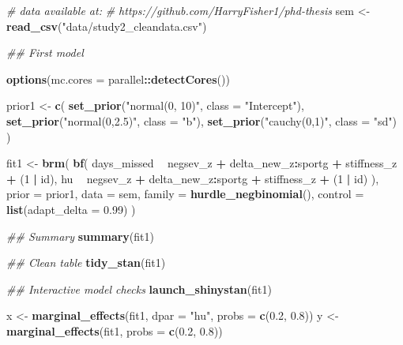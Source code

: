 \documentclass[man,floatsintext]{apa6}
\newenvironment{Shaded}{\begin{snugshade}}{\end{snugshade}}
\newcommand{\CommentTok}[1]{\textcolor[rgb]{0.56,0.35,0.01}{\textit{#1}}}
\newcommand{\DataTypeTok}[1]{\textcolor[rgb]{0.13,0.29,0.53}{#1}}
\newcommand{\DecValTok}[1]{\textcolor[rgb]{0.00,0.00,0.81}{#1}}
\newcommand{\FloatTok}[1]{\textcolor[rgb]{0.00,0.00,0.81}{#1}}
\newcommand{\KeywordTok}[1]{\textcolor[rgb]{0.13,0.29,0.53}{\textbf{#1}}}
\newcommand{\NormalTok}[1]{#1}
\newcommand{\OperatorTok}[1]{\textcolor[rgb]{0.81,0.36,0.00}{\textbf{#1}}}
\newcommand{\StringTok}[1]{\textcolor[rgb]{0.31,0.60,0.02}{#1}}
\begin{document}
\begin{Shaded}
\begin{Highlighting}[]
\CommentTok{# data available at: }
\CommentTok{# https://github.com/HarryFisher1/phd-thesis}
\NormalTok{sem <-}\StringTok{ }\KeywordTok{read_csv}\NormalTok{(}\StringTok{"data/study2_cleandata.csv"}\NormalTok{) }

\CommentTok{## First model}

\KeywordTok{options}\NormalTok{(}\DataTypeTok{mc.cores =}\NormalTok{ parallel}\OperatorTok{::}\KeywordTok{detectCores}\NormalTok{())}

\NormalTok{prior1 <-}\StringTok{ }\KeywordTok{c}\NormalTok{(}
  \KeywordTok{set_prior}\NormalTok{(}\StringTok{"normal(0, 10)"}\NormalTok{, }\DataTypeTok{class =} \StringTok{"Intercept"}\NormalTok{),}
  \KeywordTok{set_prior}\NormalTok{(}\StringTok{"normal(0,2.5)"}\NormalTok{, }\DataTypeTok{class =} \StringTok{"b"}\NormalTok{),}
  \KeywordTok{set_prior}\NormalTok{(}\StringTok{"cauchy(0,1)"}\NormalTok{, }\DataTypeTok{class =} \StringTok{"sd"}\NormalTok{)}
\NormalTok{)}

\NormalTok{fit1 <-}\StringTok{ }\KeywordTok{brm}\NormalTok{(}
  \KeywordTok{bf}\NormalTok{(}
\NormalTok{    days_missed }\OperatorTok{~}\StringTok{ }\NormalTok{negsev_z }\OperatorTok{+}\StringTok{ }\NormalTok{delta_new_z}\OperatorTok{:}\NormalTok{sportg }\OperatorTok{+}\StringTok{ }\NormalTok{stiffness_z }\OperatorTok{+}\StringTok{ }\NormalTok{(}\DecValTok{1} \OperatorTok{|}\StringTok{ }\NormalTok{id),}
\NormalTok{    hu }\OperatorTok{~}\StringTok{ }\NormalTok{negsev_z }\OperatorTok{+}\StringTok{ }\NormalTok{delta_new_z}\OperatorTok{:}\NormalTok{sportg }\OperatorTok{+}\StringTok{ }\NormalTok{stiffness_z }\OperatorTok{+}\StringTok{ }\NormalTok{(}\DecValTok{1} \OperatorTok{|}\StringTok{ }\NormalTok{id)}
\NormalTok{  ),}
  \DataTypeTok{prior =}\NormalTok{ prior1,}
  \DataTypeTok{data =}\NormalTok{ sem,}
  \DataTypeTok{family =} \KeywordTok{hurdle_negbinomial}\NormalTok{(),}
  \DataTypeTok{control =} \KeywordTok{list}\NormalTok{(}\DataTypeTok{adapt_delta =} \FloatTok{0.99}\NormalTok{)}
\NormalTok{)}

\CommentTok{## Summary}
\KeywordTok{summary}\NormalTok{(fit1)}

\CommentTok{## Clean table}
\KeywordTok{tidy_stan}\NormalTok{(fit1)}

\CommentTok{## Interactive model checks}
\KeywordTok{launch_shinystan}\NormalTok{(fit1)}

\NormalTok{x <-}\StringTok{ }\KeywordTok{marginal_effects}\NormalTok{(fit1, }\DataTypeTok{dpar =} \StringTok{"hu"}\NormalTok{, }\DataTypeTok{probs =} \KeywordTok{c}\NormalTok{(}\FloatTok{0.2}\NormalTok{, }\FloatTok{0.8}\NormalTok{))}
\NormalTok{y <-}\StringTok{ }\KeywordTok{marginal_effects}\NormalTok{(fit1, }\DataTypeTok{probs =} \KeywordTok{c}\NormalTok{(}\FloatTok{0.2}\NormalTok{, }\FloatTok{0.8}\NormalTok{))}


\end{Highlighting}
\end{Shaded}
\end{document}

